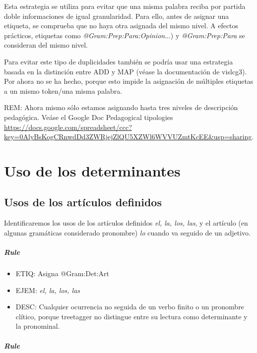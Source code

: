 \documentclass[11pt]{report}
\begin{document}
Esta estrategia se utiliza para evitar que una misma palabra reciba por partida doble informaciones de igual granularidad. Para ello, antes de asignar una etiqueta, se comprueba que no haya otra asignada del mismo nivel. A efectos prácticos, etiquetas como \emph{@Gram:Prep:Para:Opinion}...) y \emph{@Gram:Prep:Para} se consideran del mismo nivel.

Para evitar este tipo de duplicidades también se podría usar una estrategia basada en la distinción entre ADD y MAP (véase la documentación de vislcg3). Por ahora no se ha hecho, porque esto impide la asignación de múltiples etiquetas a un mismo token/una misma palabra.

REM: Ahora mismo sólo estamos asignando hasta tres niveles de descripción pedagógica. Veáse el Google Doc Pedagogical tipologies \url{https://docs.google.com/spreadsheet/ccc?key=0AlyBsKogCRnwdDd3ZWRjejZlQU5XZWl6WVVUZmtKcEE&usp=sharing}.
\chapter{Uso de los determinantes}
\section{Usos de los artículos definidos}
Identificaremos los usos de los artículos definidos \emph{el, la, los, las}, y el artículo (en algunas gramáticas considerado pronombre) \emph{lo} cuando va seguido de un adjetivo.

\paragraph*{Rule}
\begin{itemize}
\item ETIQ: Asigna @Gram:Det:Art
\item EJEM: \emph{el, la, los, las}
\item DESC: Cualquier ocurrencia no seguida de un verbo finito o un pronombre clítico, porque treetagger no distingue entre su lectura como determinante y la pronominal.
\end{itemize}

\paragraph*{Rule}
\end{document}
